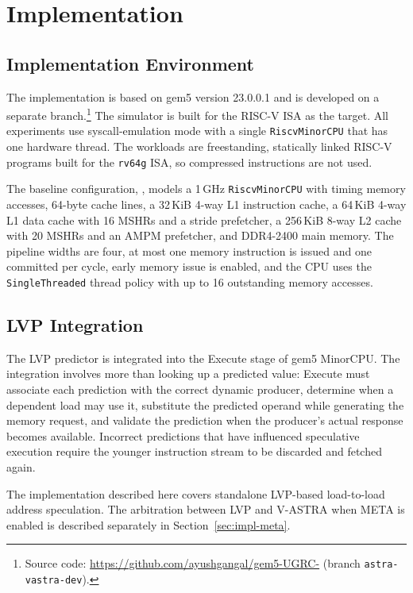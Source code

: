 \section{Implementation}

\subsection{Implementation Environment}

The implementation is based on gem5 version 23.0.0.1 and is developed
on a separate branch.\footnote{Source code: \url{https://github.com/ayushgangal/gem5-UGRC-} (branch \texttt{astra-vastra-dev}).} The simulator is built for the RISC-V ISA as the
 target. All experiments use
syscall-emulation mode with a single \texttt{RiscvMinorCPU} that has
one hardware thread. The workloads are freestanding, statically linked
RISC-V programs built for the \texttt{rv64g} ISA, so compressed
instructions are not used.

The baseline configuration, ,
models a 1\,GHz \texttt{RiscvMinorCPU} with timing memory accesses,
64-byte cache lines, a 32\,KiB 4-way L1 instruction cache, a 64\,KiB
4-way L1 data cache with 16 MSHRs and a stride prefetcher, a 256\,KiB
8-way L2 cache with 20 MSHRs and an AMPM prefetcher, and DDR4-2400
main memory. The pipeline widths are four, at most one memory
instruction is issued and one committed per cycle, early memory issue
is enabled, and the CPU uses the \texttt{SingleThreaded} thread policy
with up to 16 outstanding memory accesses.

\subsection{LVP Integration}
\label{sec:lvp-integration}

The LVP predictor is integrated into the Execute stage of gem5
MinorCPU. The integration involves more than looking up a predicted
value: Execute must associate each prediction with the correct dynamic
producer, determine when a dependent load may use it, substitute the
predicted operand while generating the memory request, and validate
the prediction when the producer's actual response becomes available.
Incorrect predictions that have influenced speculative execution
require the younger instruction stream to be discarded and fetched
again.

The implementation described here covers standalone LVP-based
load-to-load address speculation. The arbitration between LVP and
V-ASTRA when META is enabled is described separately in
Section~\ref{sec:impl-meta}.


